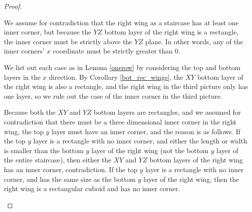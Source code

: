 \documentclass{amsart}[10pt]
\theoremstyle{plain}
\theoremstyle{definition}
\begin{document}
\begin{proof}
\begin{enumerate}
We assume for contradiction that the right wing as a staircase has at least one inner corner, but because the $YZ$ bottom layer of the right wing is a rectangle, the inner corner must be strictly above the $YZ$ plane. In other words, any of the inner corners' $x$ coordinate must be strictly greater than $0$.

We list out each case as in Lemma \ref{onerow} by considering the top and bottom layers in the $x$ direction. By Corollary \ref{bot_rec_wings}, the $XY$ bottom layer of the right wing is also a rectangle, and the right wing in the third picture only has one layer, so we rule out the case of the inner corner in the third picture. 

Because both the $XY$ and $YZ$ bottom layers are rectangles, and we assumed for contradiction that there must be a three dimensional inner corner in the right wing, the top $y$ layer must have an inner corner, and the reason is as follows. If the top $y$ layer is a rectangle with no inner corner, and either the length or width is smaller than the bottom $y$ layer of the right wing (not the bottom $y$ layer of the entire staircase), then either the $XY$ and $YZ$ bottom layers of the right wing has an inner corner, contradiction. If the top $y$ layer is a rectangle with no inner corner, and has the same size as the bottom $y$ layer of the right wing, then the right wing is a rectangular cuboid and has no inner corner.


\end{enumerate}
\end{proof}
\end{document}

